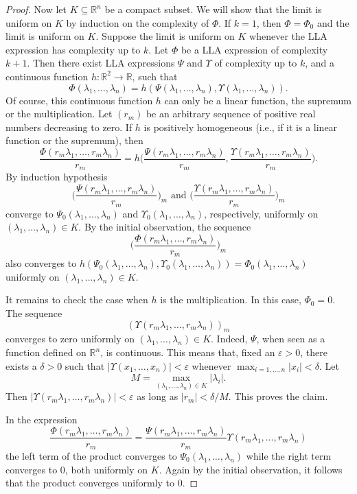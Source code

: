 \documentclass[10pt,a4paper]{amsart}
\newcommand\R{\ensuremath{\mathbb{R}}}
\begin{document}
\begin{proof}
    Now let $K\subseteq \R^{n}$ be a compact subset. We will show that
    the limit is uniform on $K$ by induction on the complexity of $\Phi $. If
    $k=1$, then $\Phi =\Phi _0$ and the limit is uniform on $K$. Suppose the
    limit is uniform on $K$ whenever the LLA expression has complexity up to $k$.
    Let $\Phi $ be a LLA expression of complexity $k+1$. Then there
    exist LLA expressions $\Psi $ and $\Upsilon $ of complexity up to $k$, and
    a continuous function $h\colon \R^2\to \R$, such that
    \[
    \Phi (\lambda _1,\ldots ,\lambda _n)=h(\Psi (\lambda _1,\ldots
    ,\lambda _n), \Upsilon (\lambda _1,\ldots ,\lambda _n)).
    \]
    Of course, this continuous function $h$ can only be a linear function,
    the supremum or the multiplication. Let $(r_m)$ be an arbitrary
    sequence of positive real numbers decreasing to zero. If $h$ is
    positively homogeneous (i.e., if it is a linear function or the
    supremum), then
    \[
        \frac{\Phi (r_m\lambda _1,\ldots ,r_m\lambda
        _n)}{r_m}=h\bigg(\frac{\Psi (r_m\lambda _1,\ldots
        ,r_m\lambda _n)}{r_m}, \frac{\Upsilon (r_m\lambda _1,\ldots
        ,r_m\lambda _n)}{r_m}\bigg).
    \]
    By induction hypothesis
    \[
    \bigg(\frac{\Psi (r_m\lambda _1,\ldots
        ,r_m\lambda _n)}{r_m}\bigg)_m\text{ and } \bigg(\frac{\Upsilon (r_m\lambda _1,\ldots
        ,r_m\lambda _n)}{r_m}\bigg)_m
    \]
    converge to $\Psi _0(\lambda _1,\ldots ,\lambda _n)$ and
    $\Upsilon_0(\lambda _1,\ldots ,\lambda _n)$, respectively, uniformly
    on $(\lambda _1,\ldots ,\lambda _n) \in K$. By the initial
    observation, the sequence
    \[
         \bigg(\frac{\Phi (r_m\lambda _1,\ldots ,r_m\lambda
        _n)}{r_m}\bigg)_m
    \]
    also converges to $h(\Psi _0(\lambda _1,\ldots ,\lambda _n),
    \Upsilon_0(\lambda _1,\ldots ,\lambda _n))=\Phi _0(\lambda_1,\ldots
    ,\lambda _n)$ uniformly on $(\lambda
    _1,\ldots ,\lambda _n) \in K$.

    It remains to check the case when $h$ is the multiplication. In
    this case, $\Phi _0=0$. The sequence
    \[
        (\Upsilon (r_m\lambda _1,\ldots ,r_m\lambda _n))_m
    \]
    converges to zero uniformly on $(\lambda _1,\ldots ,\lambda _n) \in
    K$. Indeed, $\Psi $, when seen as a function defined on $\R^{n}$, is
    continuous. This means that, fixed an $\varepsilon >0$, there exists
    a $\delta >0$ such that $|\Upsilon (x_1,\ldots ,x_n)|<\varepsilon $
    whenever $\max_{i=1,\ldots ,n}|x_i|<\delta $. Let
    \[
    M=\max_{(\lambda _1,\ldots ,\lambda _n)\in K} |\lambda _i|.
    \]
    Then $|\Upsilon (r_m\lambda _1,\ldots ,r_m\lambda _n)|<\varepsilon $
    as long as $|r_m|<\delta /M$. This proves the claim.

    In the expression
    \[
    \frac{\Phi (r_m\lambda _1,\ldots ,r_m\lambda
    _n)}{r_m}=\frac{\Psi (r_m\lambda _1,\ldots ,r_m\lambda
        _n)}{r_m}\Upsilon (r_m\lambda _1,\ldots ,r_m\lambda _n)
    \]
    the left term of the product converges to $\Psi_0(\lambda _1,\ldots
    ,\lambda _n)$ while the right term converges to $0$, both uniformly on
    $K$. Again by the initial observation, it follows that the product
    converges uniformly to $0$.
\end{proof}
\end{document}
